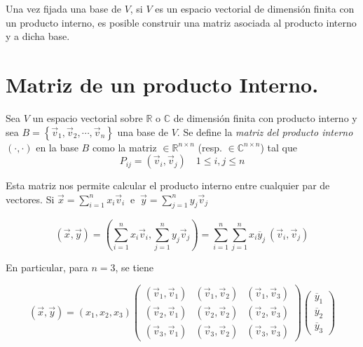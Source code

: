 \bigskip

Una vez fijada una base de $V$,   si $V$ es un espacio vectorial de dimensión finita con un producto interno,  es posible construir una matriz asociada al producto interno y a dicha base.




\section{Matriz de un producto Interno.}


\bigskip

Sea $V$ un espacio vectorial sobre $\mathbb{R}$ o $\mathbb{C}$ de dimensión finita con producto interno y sea $B= \left\{\vec{v}_1,\vec{v}_2,\cdots, \vec{v}_n\right\}$ una base de $V$. Se define  la \textit{matriz del producto interno}  $(\cdot,\cdot)$  en la base $B$ como la matriz  $\in \mathbb{R }^{n \times n }$  (resp. $\in \mathbb{C }^{n \times n }$)  tal que $$P_ {ij}= (\vec{v}_i,\vec{v}_j)  \quad1\leq i,j\leq n$$



Esta matriz nos permite calcular el producto interno entre cualquier par de vectores. Si $\vec{x}=\sum^{n}_{i=1}x_i \vec{v}_i~$  e $~\vec{y}=\sum^{n}_{j=1}y_j \vec{v}_j$

\bigskip




$$(\vec{x},\vec{y})=(\sum^{n}_{i=1}x_i \vec{v}_i,\sum^{n}_{j=1}y_j \vec{v}_j)= \sum^{n}_{i=1}\sum^{n}_{j=1}x_i \overline {y}_j ~(\vec{v}_i,\vec{v}_j) $$

\bigskip

\noindent
En particular, para $n=3$, se tiene

$$(\vec{x},\vec{y})=(x_1, x_2, x_3) \left(\begin{array}{ccc}  (\vec{v}_1, \vec{v}_1)  & (\vec{v}_1, \vec{v}_2)  & (\vec{v}_1, \vec{v}_3)   \\ (\vec{v}_2, \vec{v}_1) & (\vec{v}_2, \vec{v}_2)  & (\vec{v}_2, \vec{v}_3)  \\ (\vec{v}_3 , \vec{v}_1 )  & (\vec{v}_3 , \vec{v}_2 )& (\vec{v}_3, \vec{v}_3 )\end{array}
 \right) \left(\begin{array}{c} \overline y_{1} \\ \overline y_{2}  
\\  \overline y_3 
\end{array}\right)$$

